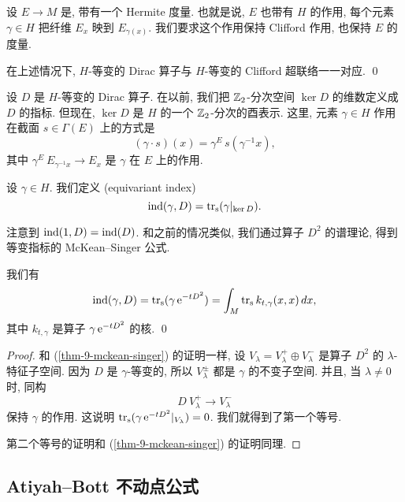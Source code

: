 设 $E \to M$ 是, 带有一个 Hermite 度量.
也就是说, $E$ 也带有 $H$ 的作用,
每个元素 $\gamma \in H$ 把纤维 $E_x$ 映到 $E_{\gamma (x)}$.
我们要求这个作用保持 Clifford 作用, 也保持 $E$ 的度量.

\begin{proposition}
    在上述情况下, $H$-等变的 Dirac 算子与 $H$-等变的 Clifford 超联络一一对应. \qed
\end{proposition}

设 $D$ 是 $H$-等变的 Dirac 算子.
在以前, 我们把 $\mathbb{Z}_2$-分次空间 $\ker D$ 的维数定义成 $D$ 的指标.
但现在, $\ker D$ 是 $H$ 的一个 $\mathbb{Z}_2$-分次的酉表示.
这里, 元素 $\gamma \in H$ 作用在截面 $s \in \Gamma (E)$ 上的方式是
\[ (\gamma \cdot s) (x) = \gamma^E \, s (\gamma^{-1} x), \]
其中 $\gamma^E \: E_{\gamma^{-1} x} \to E_x$ 是 $\gamma$ 在 $E$ 上的作用.

\begin{definition}
    设 $\gamma \in H$. 我们定义 (equivariant index)
    \[ \operatorname{ind} (\gamma, D) = \operatorname{tr}_{\mathrm{s}} (\gamma |_{\ker D}). \]
\end{definition}

注意到 $\operatorname{ind} (1, D) = \operatorname{ind} (D)$.
和之前的情况类似, 我们通过算子 $D^2$ 的谱理论, 得到等变指标的 McKean--Singer 公式.

\begin{theorem} \label{thm-10-equivar-mckean-singer}
    我们有
    \[ \operatorname{ind} (\gamma, D) = \operatorname{tr}_{\mathrm{s}} (\gamma \, \mathrm{e}^{-t D^2})
        = \int_M \operatorname{tr}_{\mathrm{s}} k_{t, \gamma} (x, x) \, dx, \]
    其中 $k_{t, \gamma}$ 是算子 $\gamma \, \mathrm{e}^{-t D^2}$ 的核. \qed
\end{theorem}

\begin{proof}
    和 (\ref{thm-9-mckean-singer}) 的证明一样,
    设 $V_\lambda = V_\lambda^+ \oplus V_\lambda^-$ 是算子 $D^2$ 的 $\lambda$-特征子空间.
    因为 $D$ 是 $\gamma$-等变的,
    所以 $V_\lambda^{\pm}$ 都是 $\gamma$ 的不变子空间.
    并且, 当 $\lambda \neq 0$ 时, 同构
    \[ D \: V_\lambda^+ \to V_\lambda^- \]
    保持 $\gamma$ 的作用. 这说明 $\operatorname{tr}_{\mathrm{s}} (\gamma \, \mathrm{e}^{-t D^2}|_{V_\lambda}) = 0$.
    我们就得到了第一个等号.
    
    第二个等号的证明和 (\ref{thm-9-mckean-singer}) 的证明同理.
\end{proof}


\subsection{Atiyah--Bott 不动点公式}

